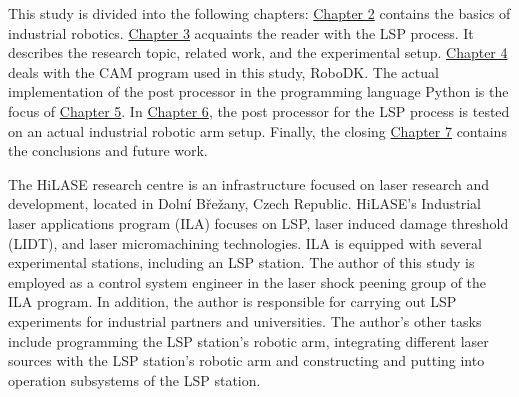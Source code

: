 This study is divided into the following chapters: \hyperref[chap:basics]{Chapter 2} contains the basics of industrial robotics. \hyperref[chap:peening]{Chapter 3} acquaints the reader with the LSP process.  It describes the research topic, related work, and the experimental setup.  
\hyperref[chap:design]{Chapter 4} deals with the CAM program used in this study, RoboDK. The actual implementation of the post processor in the programming language Python is the focus of \hyperref[chap:implementation]{Chapter 5}. In \hyperref[chap:testing]{Chapter 6}, the post processor for the LSP process is tested on an actual industrial robotic arm setup. Finally, the closing \hyperref[chap:discussion]{Chapter 7} contains the conclusions and future work. 

The HiLASE research centre is an infrastructure focused on laser research and development, located in Dolní Břežany, Czech Republic. HiLASE's Industrial laser applications program (ILA) focuses on LSP, laser induced damage threshold (LIDT), and laser micromachining technologies. ILA is equipped with several experimental stations, including an LSP station. The author of this study is employed as a control system engineer in the laser shock peening group of the ILA program. In addition, the author is responsible for carrying out LSP experiments for industrial partners and universities. The author's other tasks include programming the LSP station's robotic arm, integrating different laser sources with the  LSP station's robotic arm and constructing and putting into operation subsystems of the LSP station.





